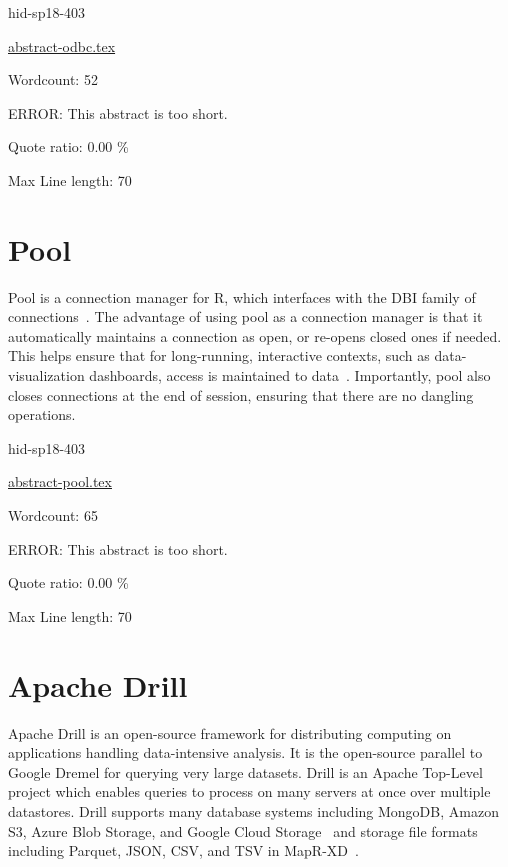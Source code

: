 \begin{IU}

hid-sp18-403

\href{https://github.com/cloudmesh-community/hid-sp18-403/blob/master//technology/abstract-odbc.tex}{abstract-odbc.tex}

 

Wordcount: 52

ERROR: This abstract is too short.


Quote ratio: 0.00 \%
 
Max Line length: 70
\end{IU}

\section{Pool}

Pool is a connection manager for R, which interfaces with the DBI
family of connections~\cite{hid-sp18-403-R-dbi}. The advantage of
using pool as a connection manager is that it automatically maintains
a connection as open, or re-opens closed ones if needed. This helps
ensure that for long-running, interactive contexts, such as
data-visualization dashboards, access is maintained to
data~\cite{hid-sp18-403-R-pool}. Importantly, pool also closes
connections at the end of session, ensuring that there are no dangling
operations.


\begin{IU}

hid-sp18-403

\href{https://github.com/cloudmesh-community/hid-sp18-403/blob/master//technology/abstract-pool.tex}{abstract-pool.tex}

 

Wordcount: 65

ERROR: This abstract is too short.


Quote ratio: 0.00 \%
 
Max Line length: 70
\end{IU}

\section{Apache Drill}

Apache Drill is an open-source framework for distributing 
computing on applications handling data-intensive analysis. 
It is the open-source parallel to Google Dremel for querying 
very large datasets. Drill is an Apache Top-Level~\cite{hid-sp18-404-BlogsApache2014} 
project which enables queries to process on many servers at once 
over multiple datastores. Drill supports many database systems 
including MongoDB, Amazon S3, Azure Blob Storage, and Google 
Cloud Storage~\cite{hid-sp18-404-Drill2015} and storage file 
formats including Parquet, JSON, CSV, and TSV in MapR-XD~\cite{hid-sp18-404-Drill2017}.

